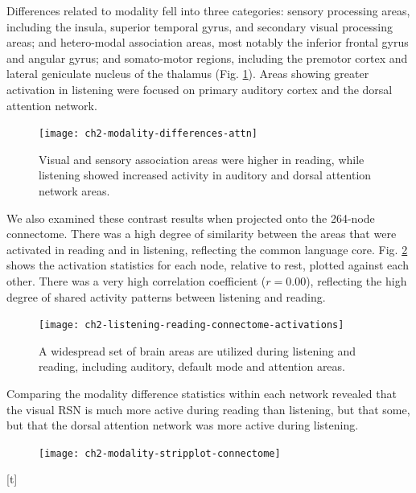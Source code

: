 Differences related to modality fell into three categories: sensory processing areas, including the insula, superior temporal gyrus, and secondary visual processing areas; and hetero-modal association areas, most notably the inferior frontal gyrus and angular gyrus; and somato-motor regions, including the premotor cortex and lateral geniculate nucleus of the thalamus (Fig. \ref{fig:ch2-modality-differences-attn}). Areas showing greater activation in listening were focused on primary auditory cortex and the dorsal attention network.

\begin{figure}[t]
	\centering
	\texttt{[image: ch2-modality-differences-attn]}
    \caption[Modality differences center on primary sensory and integration areas.]{Visual and sensory association areas were higher in reading, while listening showed increased activity in auditory and dorsal attention network areas.}
	\label{fig:ch2-modality-differences-attn}
\end{figure}

We also examined these contrast results when projected onto the 264-node connectome. There was a high degree of similarity between the areas that were activated in reading and in listening, reflecting the common language core. Fig. \ref{fig:ch2-listening-reading-connectome-activations} shows the activation statistics for each node, relative to rest, plotted against each other. There was a very high correlation coefficient ($r = 0.00$), reflecting the high degree of shared activity patterns between listening and reading.

\begin{figure}[t]
	\centering
	\texttt{[image: ch2-listening-reading-connectome-activations]}
    \caption[There is significant overlap between the areas used in listening and reading.]{A widespread set of brain areas are utilized during listening and reading, including auditory, default mode and attention areas.}
	\label{fig:ch2-listening-reading-connectome-activations}
\end{figure}

Comparing the modality difference statistics within each network revealed that the visual RSN is much more active during reading than listening, but that some, but that the dorsal attention network was more active during listening.

\begin{figure}[t]
	\centering
	\texttt{[image: ch2-modality-stripplot-connectome]}
	\caption[Modality differences show RSN-level trends.]{}
	\label{fig:ch2-modality-stripplot-connectome}
\end{figure}[t]


